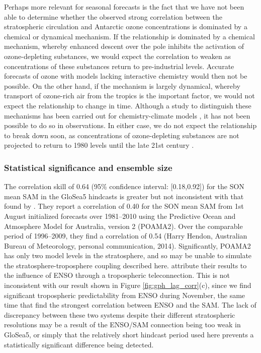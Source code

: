 Perhaps more relevant for seasonal forecasts is the fact that we have not been
able to determine whether the observed strong correlation between the
stratospheric circulation and Antarctic ozone concentrations is dominated by a
chemical or dynamical mechanism. If the relationship is dominated by a chemical
mechanism, whereby enhanced descent over the pole inhibits the activation of
ozone-depleting substances, we would expect the correlation to weaken as
concentrations of these substances return to pre-industrial levels. Accurate
forecasts of ozone with models lacking interactive chemistry would then not be
possible. On the other hand, if the mechanism is largely dynamical, whereby
transport of ozone-rich air from the tropics is the important factor, we would
not expect the relationship to change in time.  Although a study to distinguish
these mechanisms has been carried out for chemistry-climate models
\citep{Garny2011}, it has not been possible to do so in observations. In either
case, we do not expect the relationship to break down soon, as concentrations of
ozone-depleting substances are not projected to return to 1980 levels until the
late 21st century \citep{WMO2010}.

\subsubsection{Statistical significance and ensemble size}

The correlation skill of 0.64 (95\% confidence interval: [0.18,0.92]) for the
SON mean SAM in the GloSea5 hindcasts is greater but not inconsistent with that
found by \citet{Lim2013}. They report a correlation of 0.40 for the SON mean SAM
from 1st August initialized forecasts over 1981--2010 using the Predictive Ocean
and Atmosphere Model for Australia, version 2 (POAMA2). Over the comparable
period of 1996--2009, they find a correlation of 0.54 (Harry Hendon, Australian
Bureau of Meteorology, personal communication, 2014).  Significantly, POAMA2 has
only two model levels in the stratosphere, and so may be unable to simulate the
stratosphere-troposphere coupling described here. \citet{Lim2013} attribute
their results to the influence of ENSO through a tropospheric
teleconnection. This is not inconsistent with our result shown in Figure
\ref{fig:gph_lag_corr}(c), since we find significant tropospheric predictability
from ENSO during November, the same time that \citet{Lim2013} find the strongest
correlation between ENSO and the SAM. The lack of discrepancy between these two
systems despite their different stratospheric resolutions may be a result of the
ENSO/SAM connection being too weak in GloSea5, or simply that the relatively
short hindcast period used here prevents a statistically significant difference
being detected.

